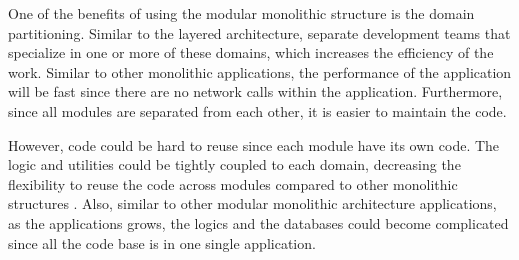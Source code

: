 One of the benefits of using the modular monolithic structure is the domain partitioning. Similar to the layered architecture,
separate development teams that specialize in one or more of these domains, which increases the efficiency of the work.
Similar to other monolithic applications, the performance of the application will be fast since there are no network calls within the application.
Furthermore, since all modules are separated from each other, it is easier to maintain the code.

However, code could be hard to reuse since each module have its own code. The logic and utilities could be tightly coupled to each domain,
decreasing the flexibility to reuse the code across modules compared to other monolithic structures \cite{Gandhi_Richards_Ford_2024}. Also, similar to other modular monolithic architecture
applications, as the applications grows, the logics and the databases could become complicated since all the code base is in one single application.




